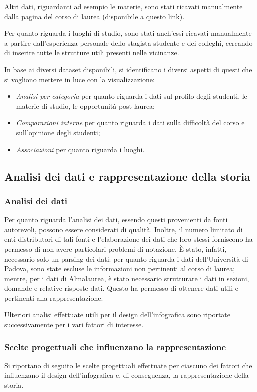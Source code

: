 Altri dati, riguardanti ad esempio le materie, sono stati ricavati manualmente dalla pagina del corso di laurea (disponibile a \href{https://www.didattica.unipd.it/off/2023/LT/SC/SC1167}{questo link}).

Per quanto riguarda i luoghi di studio, sono stati anch'essi ricavati manualmente a partire dall'esperienza personale dello stagista-studente e dei colleghi, cercando di inserire tutte le strutture utili presenti nelle vicinanze.

\bigskip
\noindent In base ai diversi dataset disponibili, si identificano i diversi aspetti di questi che si vogliono mettere in luce con la visualizzazione:
\begin{itemize}
    \item \emph{Analisi per categoria} per quanto riguarda i dati sul profilo degli studenti, le materie di studio, le opportunità post-laurea;
    \item \emph{Comparazioni interne} per quanto riguarda i dati sulla difficoltà del corso e sull'opinione degli studenti;
    \item \emph{Associazioni} per quanto riguarda i luoghi.
\end{itemize}

\subsection{Analisi dei dati e rappresentazione della storia}
\subsubsection{Analisi dei dati}
Per quanto riguarda l'analisi dei dati, essendo questi provenienti da fonti autorevoli, possono essere considerati di qualità. Inoltre, il numero limitato di enti distributori di tali fonti e l'elaborazione 
dei dati che loro stessi forniscono ha permesso di non avere particolari problemi di notazione. 
È stato, infatti, necessario solo un parsing dei dati: per quanto riguarda i dati dell'Università di Padova, sono state escluse le informazioni non pertinenti al corso di laurea;
mentre, per i dati di Almalaurea, è stato necessario strutturare i dati in sezioni, domande e relative risposte-dati. 
Questo ha permesso di ottenere dati utili e pertinenti alla rappresentazione.

Ulteriori analisi effettuate utili per il design dell'infografica sono riportate successivamente per i vari fattori di interesse.

\subsubsection{Scelte progettuali che influenzano la rappresentazione}
Si riportano di seguito le scelte progettuali effettuate per ciascuno dei fattori che influenzano il design dell'infografica
e, di conseguenza, la rappresentazione della storia.

